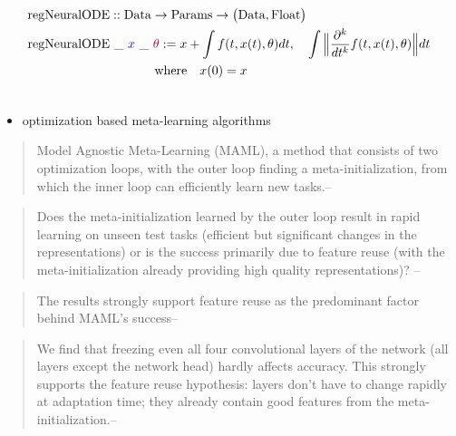 \documentclass[a4paper,12pt]{article}
\begin{document}
\begin{align*}
    &\text{regNeuralODE} :: \text{Data} \rightarrow \text{Params} \rightarrow \big(\textrm{Data}, \text{Float}\big) \\
&\text{regNeuralODE} \ \_ \ \textcolor{blue}{x} \ \_ \ \textcolor{purple}{\theta} := x + \int f(t, x(t), \theta)dt, \quad \int \Big\| \frac{\partial ^k}{dt^k}f(t, x(t), \theta) \Big\|dt \\ 
& \quad \quad \quad \quad \quad \quad \quad \quad \quad \quad \text{where}  \quad x(0)=x \\ \\ 
\end{align*}
\begin{itemize}
    \item optimization based meta-learning algorithms
\end{itemize}
\begin{quote}
Model Agnostic Meta-Learning (MAML), a method that consists of two optimization loops, with the outer loop finding a meta-initialization,
from which the inner loop can efficiently learn new tasks.-- \cite{raghu2019rapid}
\end{quote}
\begin{quote}
    Does the meta-initialization learned by the
outer loop result in rapid learning on unseen test tasks (efficient but significant changes in the
representations) or is the success primarily due to feature reuse (with the meta-initialization already
providing high quality representations)? -- \cite{raghu2019rapid}
\end{quote}
\begin{quote}
    The results strongly support feature reuse as the predominant factor
behind MAML’s success-- \cite{raghu2019rapid}
\end{quote}
\begin{quote}
    We find that freezing even all four convolutional layers of the network (all layers except the network head) hardly
affects accuracy. This strongly supports the feature reuse hypothesis: layers don’t have to change rapidly at
adaptation time; they already contain good features from the meta-initialization.-- \cite{raghu2019rapid}
\end{quote}
\end{document}
